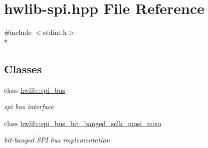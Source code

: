\hypertarget{hwlib-spi_8hpp}{}\section{hwlib-\/spi.hpp File Reference}
\label{hwlib-spi_8hpp}
{\ttfamily \#include $<$stdint.\+h$>$}\\*
\subsection*{Classes}
\begin{DoxyCompactItemize}
\item 
class \hyperlink{classhwlib_1_1spi__bus}{hwlib\+::spi\+\_\+bus}
\begin{DoxyCompactList}\small\item\em spi bus interface \end{DoxyCompactList}\item 
class \hyperlink{classhwlib_1_1spi__bus__bit__banged__sclk__mosi__miso}{hwlib\+::spi\+\_\+bus\+\_\+bit\+\_\+banged\+\_\+sclk\+\_\+mosi\+\_\+miso}
\begin{DoxyCompactList}\small\item\em bit-\/banged S\+PI bus implementation \end{DoxyCompactList}\end{DoxyCompactItemize}
